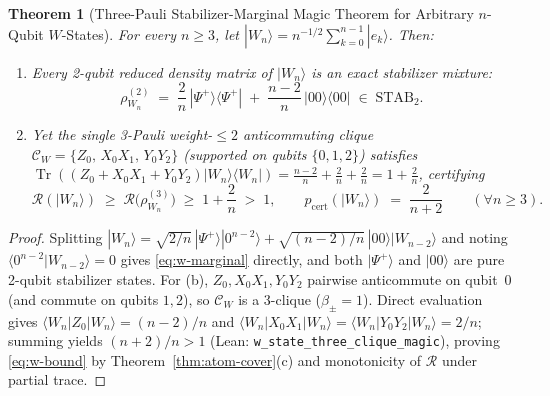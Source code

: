 \documentclass[11pt,a4paper]{article}
\newtheorem{theorem}{Theorem}[section]
\theoremstyle{definition}
\theoremstyle{remark}
\newcommand{\STAB}{\mathrm{STAB}}
\newcommand{\RoM}{\mathcal{R}}
\newcommand{\Tr}{\operatorname{Tr}}
\newcommand{\Code}[1]{{\small\texttt{#1}}}
\begin{document}
\begin{theorem}[Three-Pauli Stabilizer-Marginal Magic Theorem for Arbitrary $n$-Qubit $W$-States]
\label{thm:w-state}
For every $n \ge 3$, let $|W_n\rangle = n^{-1/2}\sum_{k=0}^{n-1} |e_k\rangle$. Then:
\begin{enumerate}[label=(\alph*),leftmargin=1.8em,itemsep=2pt]
  \item Every 2-qubit reduced density matrix of $|W_n\rangle$ is an exact stabilizer mixture:
  \begin{equation}
    \rho^{(2)}_{W_n} \;=\; \frac{2}{n}\,|\Psi^+\rangle\langle\Psi^+| \;+\; \frac{n-2}{n}\,|00\rangle\langle 00| \;\in\; \STAB_2.
    \label{eq:w-marginal}
  \end{equation}
  \item Yet the single 3-Pauli weight-$\le 2$ anticommuting clique $\mathcal{C}_W = \{Z_0,\, X_0 X_1,\, Y_0 Y_2\}$ (supported on qubits $\{0,1,2\}$) satisfies $\Tr((Z_0 + X_0 X_1 + Y_0 Y_2)|W_n\rangle\langle W_n|) = \frac{n-2}{n} + \frac{2}{n} + \frac{2}{n} = 1 + \frac{2}{n}$, certifying
  \begin{equation}
    \RoM(|W_n\rangle) \;\ge\; \RoM\bigl(\rho^{(3)}_{W_n}\bigr) \;\ge\; 1 + \frac{2}{n} \;>\; 1, \qquad
    p_{\mathrm{cert}}(|W_n\rangle) \;=\; \frac{2}{n + 2} \qquad (\forall n \ge 3).
    \label{eq:w-bound}
  \end{equation}
\end{enumerate}
\end{theorem}
\begin{proof}
Splitting $|W_n\rangle = \sqrt{2/n}\,|\Psi^+\rangle|0^{n-2}\rangle + \sqrt{(n-2)/n}\,|00\rangle|W_{n-2}\rangle$ and noting $\langle 0^{n-2}|W_{n-2}\rangle = 0$ gives \eqref{eq:w-marginal} directly, and both $|\Psi^+\rangle$ and $|00\rangle$ are pure 2-qubit stabilizer states. For (b), $Z_0, X_0 X_1, Y_0 Y_2$ pairwise anticommute on qubit~$0$ (and commute on qubits $1, 2$), so $\mathcal{C}_W$ is a 3-clique ($\hat{\beta}_\pm = 1$). Direct evaluation gives $\langle W_n|Z_0|W_n\rangle = (n-2)/n$ and $\langle W_n|X_0 X_1|W_n\rangle = \langle W_n|Y_0 Y_2|W_n\rangle = 2/n$; summing yields $(n+2)/n > 1$ (Lean: \Code{w\_\allowbreak state\_\allowbreak three\_\allowbreak clique\_\allowbreak magic}), proving \eqref{eq:w-bound} by Theorem~\ref{thm:atom-cover}(c) and monotonicity of $\RoM$ under partial trace.
\end{proof}
\end{document}
